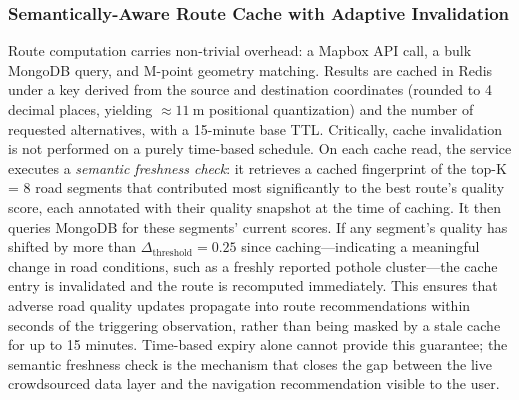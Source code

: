 \documentclass[conference]{IEEEtran}
\begin{document}
\subsubsection{Semantically-Aware Route Cache with Adaptive Invalidation}
Route computation carries non-trivial overhead: a Mapbox API call, a bulk MongoDB query, and M-point geometry matching.
Results are cached in Redis under a key derived from the source and destination coordinates (rounded to 4 decimal places, yielding $\approx 11~\text{m}$ positional quantization) and the number of requested alternatives, with a 15-minute base TTL.
Critically, cache invalidation is not performed on a purely time-based schedule.
On each cache read, the service executes a \textit{semantic freshness check}: it retrieves a cached fingerprint of the top-K = 8 road segments that contributed most significantly to the best route's quality score, each annotated with their quality snapshot at the time of caching.
It then queries MongoDB for these segments' current scores. If any segment's quality has shifted by more than $\Delta_{\text{threshold}} = 0.25$ since caching---indicating a meaningful change in road conditions, such as a freshly reported pothole cluster---the cache entry is invalidated and the route is recomputed immediately.
This ensures that adverse road quality updates propagate into route recommendations within seconds of the triggering observation, rather than being masked by a stale cache for up to 15 minutes.
Time-based expiry alone cannot provide this guarantee; the semantic freshness check is the mechanism that closes the gap between the live crowdsourced data layer and the navigation recommendation visible to the user.

\end{document}
